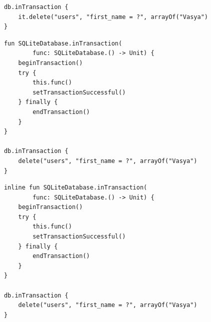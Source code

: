 \documentclass{beamer}
\begin{document}
\begin{frame}[fragile, t]
\begin{overprint}
\begin{verbatim}
            db.inTransaction {
                it.delete("users", "first_name = ?", arrayOf("Vasya")
            }
        \end{verbatim}

        \begin{verbatim}
            fun SQLiteDatabase.inTransaction(
                    func: SQLiteDatabase.() -> Unit) {
                beginTransaction()
                try {
                    this.func()
                    setTransactionSuccessful()
                } finally {
                    endTransaction()
                }
            }

            db.inTransaction {
                delete("users", "first_name = ?", arrayOf("Vasya")
            }
        \end{verbatim}

        \begin{verbatim}
            inline fun SQLiteDatabase.inTransaction(
                    func: SQLiteDatabase.() -> Unit) {
                beginTransaction()
                try {
                    this.func()
                    setTransactionSuccessful()
                } finally {
                    endTransaction()
                }
            }

            db.inTransaction {
                delete("users", "first_name = ?", arrayOf("Vasya")
            }
        \end{verbatim}
    \end{overprint}

\end{frame}
\end{document}
